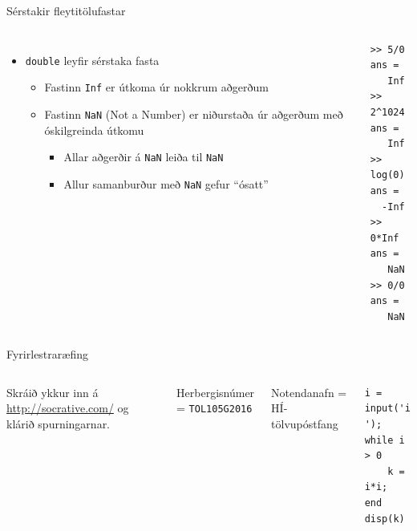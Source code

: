 \documentclass{beamer}
\begin{document}
\begin{frame}[fragile]{Sérstakir fleytitölufastar}
\begin{columns}
\begin{itemize}
 \item \texttt{double} leyfir sérstaka fasta
 \begin{itemize}
  \item Fastinn \texttt{Inf} er útkoma úr nokkrum aðgerðum
  \item Fastinn \texttt{NaN} (Not a Number) er niðurstaða úr aðgerðum með óskilgreinda útkomu
  \begin{itemize}
   \item Allar aðgerðir á \texttt{NaN} leiða til \texttt{NaN}
   \item Allur samanburður með \texttt{NaN} gefur ``ósatt''
  \end{itemize}
 \end{itemize}
\end{itemize}
\begin{verbatim}
>> 5/0
ans =
   Inf
>> 2^1024
ans =
   Inf
>> log(0)
ans =
  -Inf
>> 0*Inf
ans =
   NaN
>> 0/0
ans =
   NaN
\end{verbatim}
\end{columns}
\end{frame}

\begin{frame}[fragile]{Fyrirlestraræfing}
\begin{columns}
Skráið ykkur inn á \url{http://socrative.com/} og klárið spurningarnar.

Herbergisnúmer = \texttt{TOL105G2016}

Notendanafn = HÍ-tölvupóstfang
\begin{verbatim}
i = input('i: ');
while i > 0
    k = i*i;
end
disp(k)
\end{verbatim}
\end{columns}
\end{frame}
\end{document}
